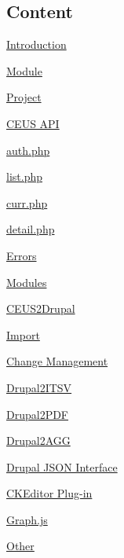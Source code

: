 \hypertarget{index_pageTOC}{}\subsection{Content}\label{index_pageTOC}

\begin{DoxyEnumerate}
\item \hyperlink{index_Introduction}{Introduction}
\begin{DoxyEnumerate}
\item \hyperlink{index_Module_Intro}{Module}
\item \hyperlink{index_Project_Intro}{Project}
\end{DoxyEnumerate}
\item \hyperlink{index_ceusapi}{C\+E\+U\+S A\+P\+I}
\begin{DoxyEnumerate}
\item \hyperlink{index_auth}{auth.\+php}
\item \hyperlink{index_list}{list.\+php}
\item \hyperlink{index_curr}{curr.\+php}
\item \hyperlink{index_detail}{detail.\+php}
\item \hyperlink{index_Errors}{Errors}
\end{DoxyEnumerate}
\item \hyperlink{index_Modules}{Modules}
\begin{DoxyEnumerate}
\item \hyperlink{index_CEUS2Drupal}{C\+E\+U\+S2\+Drupal}
\begin{DoxyEnumerate}
\item \hyperlink{index_Import}{Import}
\item \hyperlink{index_change_management}{Change Management}
\end{DoxyEnumerate}
\item \hyperlink{index_Drupal2ITSV}{Drupal2\+I\+T\+S\+V}
\item \hyperlink{index_Drupal2PDF}{Drupal2\+P\+D\+F}
\item \hyperlink{index_Drupal2AGG}{Drupal2\+A\+G\+G}
\begin{DoxyEnumerate}
\item \hyperlink{index_json}{Drupal J\+S\+O\+N Interface}
\item \hyperlink{index_plugin}{C\+K\+Editor Plug-\/in}
\item \hyperlink{index_graph}{Graph.\+js}
\end{DoxyEnumerate}
\item \hyperlink{index_Other}{Other}

\end{DoxyEnumerate}
\end{DoxyEnumerate}

